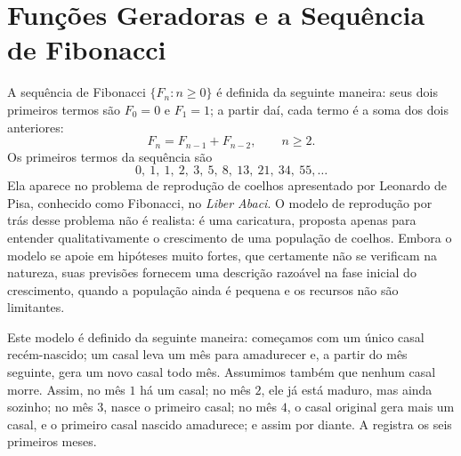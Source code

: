 \documentclass[12pt,portuguese]{article}
\theoremstyle{definition}
\theoremstyle{plainexercise}
\theoremstyle{starredexercise}
\theoremstyle{definition}
\begin{document}
\section{Funções Geradoras e a Sequência de Fibonacci}
\label{sec:fibonacci}

A sequência de Fibonacci $\{F_n: n\geqslant 0\}$ é definida da seguinte
maneira: seus dois primeiros termos são $F_0=0$ e $F_1=1$; a partir daí,
cada termo é a soma dos dois anteriores:
\begin{equation}\label{eq:rec-fibonacci}
F_n=F_{n-1}+F_{n-2},
\qquad n\geqslant 2.
\end{equation}
Os primeiros termos da sequência são
\[
0,\ 1,\ 1,\ 2,\ 3,\ 5,\ 8,\ 13,\ 21,\ 34,\ 55,\ldots
\]
Ela aparece no problema de reprodução de coelhos apresentado por Leonardo de
Pisa, conhecido como Fibonacci, no \emph{Liber Abaci}. O modelo de reprodução
por trás desse problema não é realista: é uma caricatura, proposta apenas
para entender qualitativamente o crescimento de uma população de coelhos.
Embora o modelo se apoie em hipóteses muito fortes, que certamente não se
verificam na natureza, suas previsões fornecem uma descrição razoável na fase inicial do
crescimento, quando a população ainda é pequena e os recursos não são
limitantes.

Este modelo é definido da seguinte maneira: começamos com um único casal
recém-nascido; um casal leva um mês para amadurecer e, a partir do mês
seguinte, gera um novo casal todo mês. Assumimos também que 
nenhum casal morre. Assim, no mês $1$
há um casal; no mês $2$, ele já está maduro, mas ainda sozinho; no mês $3$,
nasce o primeiro casal; no mês $4$, o casal original gera mais um casal, e o
primeiro casal nascido amadurece; e assim por diante. A 
registra os seis primeiros meses.
\end{document}
